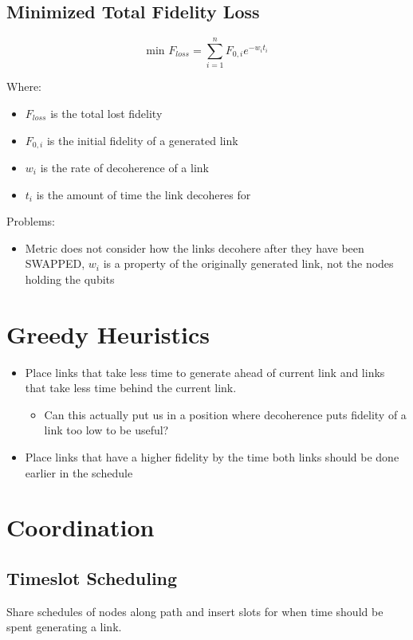 \documentclass{article}
\begin{document}
\subsection{Minimized Total Fidelity Loss}

$$\text{min } F_{loss} = \sum_{i=1}^{n} F_{0,i}e^{-w_it_i}$$

Where:
\begin{itemize}
    \item $F_{loss}$ is the total lost fidelity
    \item $F_{0,i}$ is the initial fidelity of a generated link
    \item $w_i$ is the rate of decoherence of a link
    \item $t_i$ is the amount of time the link decoheres for
\end{itemize}

Problems:
\begin{itemize}
    \item Metric does not consider how the links decohere after they have been SWAPPED, $w_i$ is a property of the
    originally generated link, not the nodes holding the qubits
\end{itemize}

\section{Greedy Heuristics}
\begin{itemize}
    \item Place links that take less time to generate ahead of current link and links that take less time behind the current link.
    \begin{itemize}
        \item Can this actually put us in a position where decoherence puts fidelity of a link too low to be useful?
    \end{itemize}
    \item Place links that have a higher fidelity by the time both links should be done earlier in the schedule
\end{itemize}

\section{Coordination}
\subsection{Timeslot Scheduling}
Share schedules of nodes along path and insert slots for when time should be spent generating a link.
\end{document}
